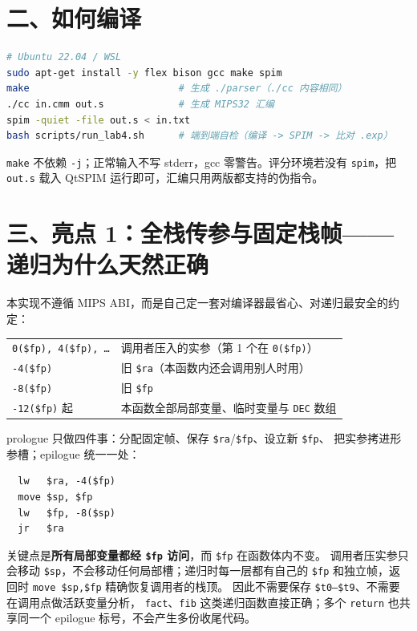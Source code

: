 \documentclass[11pt,a4paper]{ctexart}
\newcommand{\code}[1]{\texttt{#1}}
\begin{document}
\section*{二、如何编译}

\begin{lstlisting}[language=bash]
# Ubuntu 22.04 / WSL
sudo apt-get install -y flex bison gcc make spim
make                          # 生成 ./parser（./cc 内容相同）
./cc in.cmm out.s             # 生成 MIPS32 汇编
spim -quiet -file out.s < in.txt
bash scripts/run_lab4.sh      # 端到端自检（编译 -> SPIM -> 比对 .exp）
\end{lstlisting}

\code{make} 不依赖 \code{-j}；正常输入不写 stderr，gcc 零警告。评分环境若没有
\code{spim}，把 \code{out.s} 载入 QtSPIM 运行即可，汇编只用两版都支持的伪指令。

\section*{三、亮点 1：全栈传参与固定栈帧——递归为什么天然正确}

本实现不遵循 MIPS ABI，而是自己定一套对编译器最省心、对递归最安全的约定：

\begin{center}
\begin{tabular}{@{}ll@{}}
\code{0(\$fp), 4(\$fp), \dots} & 调用者压入的实参（第 1 个在 \code{0(\$fp)}）\\
\code{-4(\$fp)} & 旧 \code{\$ra}（本函数内还会调用别人时用）\\
\code{-8(\$fp)} & 旧 \code{\$fp}\\
\code{-12(\$fp)} 起 & 本函数全部局部变量、临时变量与 \code{DEC} 数组
\end{tabular}
\end{center}

prologue 只做四件事：分配固定帧、保存 \code{\$ra}/\code{\$fp}、设立新 \code{\$fp}、
把实参拷进形参槽；epilogue 统一一处：

\begin{lstlisting}
  lw   $ra, -4($fp)
  move $sp, $fp
  lw   $fp, -8($sp)
  jr   $ra
\end{lstlisting}

关键点是\textbf{所有局部变量都经 \code{\$fp} 访问}，而 \code{\$fp} 在函数体内不变。
调用者压实参只会移动 \code{\$sp}，不会移动任何局部槽；递归时每一层都有自己的
\code{\$fp} 和独立帧，返回时 \code{move \$sp,\$fp} 精确恢复调用者的栈顶。
因此不需要保存 \code{\$t0–\$t9}、不需要在调用点做活跃变量分析，
\code{fact}、\code{fib} 这类递归函数直接正确；多个 \code{return} 也共享同一个
epilogue 标号，不会产生多份收尾代码。
\end{document}
